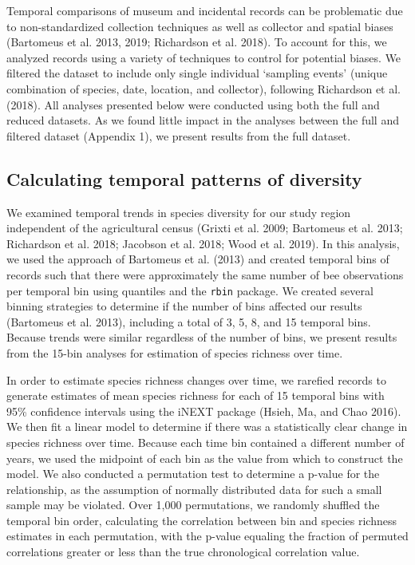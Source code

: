 \documentclass[11pt,]{article}
\begin{document}
Temporal comparisons of museum and incidental records can be problematic
due to non-standardized collection techniques as well as collector and
spatial biases (Bartomeus et al. 2013, 2019; Richardson et al. 2018). To
account for this, we analyzed records using a variety of techniques to
control for potential biases. We filtered the dataset to include only
single individual `sampling events' (unique combination of species,
date, location, and collector), following Richardson et al. (2018). All
analyses presented below were conducted using both the full and reduced
datasets. As we found little impact in the analyses between the full and
filtered dataset (Appendix 1), we present results from the full dataset.

\hypertarget{calculating-temporal-patterns-of-diversity}{%
\subsection{Calculating temporal patterns of
diversity}\label{calculating-temporal-patterns-of-diversity}}

We examined temporal trends in species diversity for our study region
independent of the agricultural census (Grixti et al. 2009; Bartomeus et
al. 2013; Richardson et al. 2018; Jacobson et al. 2018; Wood et al.
2019). In this analysis, we used the approach of Bartomeus et al. (2013)
and created temporal bins of records such that there were approximately
the same number of bee observations per temporal bin using quantiles and
the \texttt{rbin} package. We created several binning strategies to
determine if the number of bins affected our results (Bartomeus et al.
2013), including a total of 3, 5, 8, and 15 temporal bins. Because
trends were similar regardless of the number of bins, we present results
from the 15-bin analyses for estimation of species richness over time.

In order to estimate species richness changes over time, we rarefied
records to generate estimates of mean species richness for each of 15
temporal bins with 95\% confidence intervals using the iNEXT package
(Hsieh, Ma, and Chao 2016). We then fit a linear model to determine if
there was a statistically clear change in species richness over time.
Because each time bin contained a different number of years, we used the
midpoint of each bin as the value from which to construct the model. We
also conducted a permutation test to determine a p-value for the
relationship, as the assumption of normally distributed data for such a
small sample may be violated. Over 1,000 permutations, we randomly
shuffled the temporal bin order, calculating the correlation between bin
and species richness estimates in each permutation, with the p-value
equaling the fraction of permuted correlations greater or less than the
true chronological correlation value.
\end{document}
